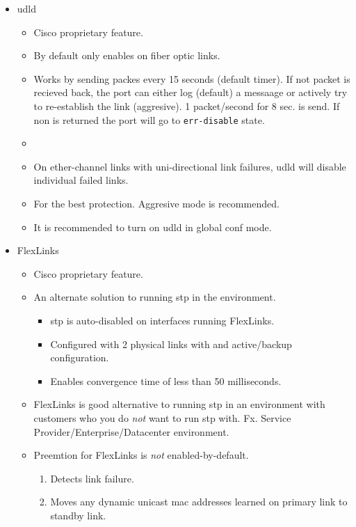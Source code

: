 \begin{itemize}
    \item \gls{udld}
    \begin{itemize}
        \item Cisco proprietary feature.
        \item By default only enables on fiber optic links.
        \item Works by sending packes every 15 seconds (default timer). If not packet is recieved back, the port can either log (default) a messaage or actively try to re-establish the link (aggresive). 1 packet/second for 8 sec. is send. If non is returned the port will go to \texttt{err-disable} state.
        \item {}
        \item On ether-channel links with uni-directional link failures, udld will disable individual failed links.
        \item For the best protection. Aggresive mode is recommended.
        \item It is recommended to turn on udld in global conf mode.
    \end{itemize}
    \item FlexLinks
    \begin{itemize}
        \item Cisco proprietary feature.
        \item An alternate solution to running \gls{stp} in the environment.
        \begin{itemize}
            \item \gls{stp} is auto-disabled on interfaces running FlexLinks.
            \item Configured with 2 physical links with and active/backup configuration.
            \item Enables convergence time of less than 50 milliseconds.
        \end{itemize}
        \item FlexLinks is good alternative to running \gls{stp} in an environment with customers who you do \textit{not} want to run \gls{stp} with. Fx. Service Provider/Enterprise/Datacenter environment.
        \item Preemtion for FlexLinks is \textit{not} enabled-by-default.
        \begin{enumerate}
            \item Detects link failure.
            \item Moves any dynamic unicast \gls{mac} addresses learned on primary link to standby link.

\end{enumerate}
\end{itemize}
\end{itemize}
